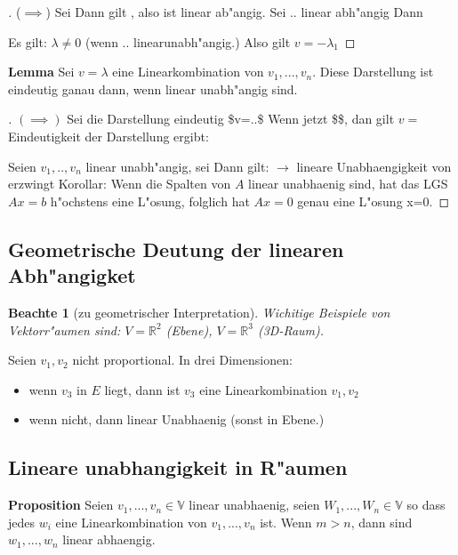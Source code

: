\documentclass[11pt]{article}
\newtheorem*{notte}{Beachte}
\begin{document}
\begin{proof}[] \label{}
(\(\implies\)) Sei Dann gilt , also ist linear ab"angig.
Sei .. linear abh"angig  Dann 

Es gilt: \(\lambda \not= 0\) (wenn  .. linearunabh"angig.) Also gilt \(v=-\lambda_1\)
\end{proof}

\textbf{Lemma} Sei \(v=\lambda\) eine Linearkombination von \(v_1,...,v_n\). Diese
Darstellung ist eindeutig ganau dann, wenn linear unabh"angig sind.

\begin{proof}[] \label{}
\((\implies)\) Sei die Darstellung eindeutig \$v=..\$ Wenn jetzt \$\$, dan gilt \(v=\)
Eindeutigkeit der Darstellung ergibt:

Seien \(v_1,..,v_n\) linear unabh"angig, sei 
Dann gilt: \(\rightarrow\) lineare Unabhaengigkeit von erzwingt Korollar: Wenn die
Spalten von \(A\) linear unabhaenig sind, hat das LGS \(Ax=b\) h"ochstens eine
L"osung, folglich hat \(Ax=0\) genau eine L"osung x=0.
\end{proof}

\subsection{Geometrische Deutung der linearen Abh"angigket}
\label{sec:org95b9a1d}
\begin{notte}[zu geometrischer Interpretation] \label{}
Wichitige Beispiele von Vektorr"aumen sind: \(V=\mathbb{R}^2\) (Ebene),
\(V=\mathbb{R}^3\) (3D-Raum).
\end{notte}

Seien \(v_1, v_2\) nicht proportional.
In drei Dimensionen:
\begin{relation}
\begin{itemize}
\item wenn \(v_3\) in \(E\) liegt, dann ist \(v_3\) eine Linearkombination \(v_1, v_2\)
\item wenn nicht, dann linear Unabhaenig (sonst in Ebene.)
\end{itemize}
\end{relation}

\subsection{Lineare unabhangigkeit in R"aumen}
\label{sec:orgea5b4b9}
\textbf{Proposition} Seien \(v_1,...,v_n \in \mathbb{V}\) linear unabhaenig, seien \(W_1,
..., W_n \in \mathbb{V}\) so dass jedes \(w_i\) eine Linearkombination von
\(v_1,...,v_n\) ist. Wenn \(m>n\), dann sind \(w_1,...,w_n\) linear abhaengig.
\end{document}
